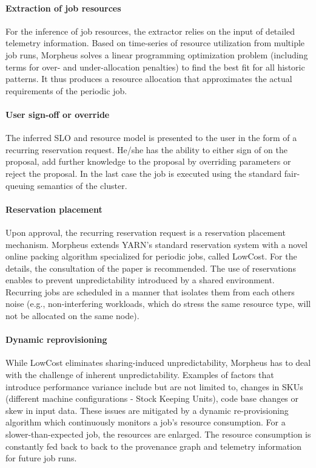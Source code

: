 \paragraph{Extraction of job resources}
For the inference of job resources, the extractor relies on the input of detailed telemetry information. Based on time-series of resource utilization from multiple job runs, Morpheus solves a linear programming optimization problem (including terms for over- and under-allocation penalties) to find the best fit for all historic patterns. It thus produces a resource allocation that approximates the actual requirements of the periodic job.~\cite{jyothi2016morpheus}
\paragraph{User sign-off or override}
The inferred SLO and resource model is presented to the user in the form of a recurring reservation request. He/she has the ability to either sign of on the proposal, add further knowledge to the proposal by overriding parameters or reject the proposal. In the last case the job is executed using the standard fair-queuing semantics of the cluster.~\cite{jyothi2016morpheus}
\paragraph{Reservation placement}
Upon approval, the recurring reservation request is a reservation placement mechanism. Morpheus extends YARN's standard reservation system with a novel online packing algorithm specialized for periodic jobs, called LowCost. For the details, the consultation of the paper is recommended. The use of reservations enables to prevent unpredictability introduced by a shared environment. Recurring jobs are scheduled in a manner that isolates them from each others noise (e.g., non-interfering workloads, which do  stress the same resource type, will not be allocated on the same node).~\cite{jyothi2016morpheus}
\paragraph{Dynamic reprovisioning}
While LowCost eliminates sharing-induced unpredictability, Morpheus has to deal with the challenge of inherent unpredictability. Examples of factors that introduce performance variance include but are not limited to, changes in SKUs (different machine configurations - Stock Keeping Units), code base changes or skew in input data. These issues are mitigated by a dynamic re-provisioning algorithm which continuously monitors a job's resource consumption. For a slower-than-expected job, the resources are enlarged. The resource consumption is constantly fed back to back to the provenance graph and telemetry information for future job runs.~\cite{jyothi2016morpheus}

